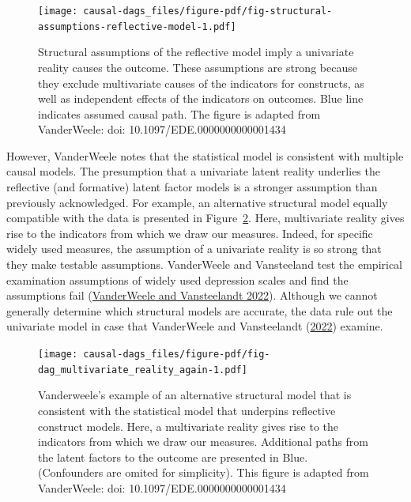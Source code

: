 \documentclass[
  singlecolumn]{article}
\begin{document}
\begin{figure}

{\centering \texttt{[image: causal-dags\_files/figure-pdf/fig-structural-assumptions-reflective-model-1.pdf]}

}

\caption{\label{fig-structural-assumptions-reflective-model}Structural
assumptions of the reflective model imply a univariate reality causes
the outcome. These assumptions are strong because they exclude
multivariate causes of the indicators for constructs, as well as
independent effects of the indicators on outcomes. Blue line indicates
assumed causal path. The figure is adapted from VanderWeele: doi:
10.1097/EDE.0000000000001434}

\end{figure}

However, VanderWeele notes that the statistical model is consistent with
multiple causal models. The presumption that a univariate latent reality
underlies the reflective (and formative) latent factor models is a
stronger assumption than previously acknowledged. For example, an
alternative structural model equally compatible with the data is
presented in Figure~\ref{fig-dag_multivariate_reality_again}. Here,
multivariate reality gives rise to the indicators from which we draw our
measures. Indeed, for specific widely used measures, the assumption of a
univariate reality is so strong that they make testable assumptions.
VanderWeele and Vansteeland test the empirical examination assumptions
of widely used depression scales and find the assumptions fail
(\protect\hyperlink{ref-vanderweele2022b}{VanderWeele and Vansteelandt
2022}). Although we cannot generally determine which structural models
are accurate, the data rule out the univariate model in case that
VanderWeele and Vansteelandt
(\protect\hyperlink{ref-vanderweele2022b}{2022}) examine.

\begin{figure}

{\centering \texttt{[image: causal-dags\_files/figure-pdf/fig-dag\_multivariate\_reality\_again-1.pdf]}

}

\caption{\label{fig-dag_multivariate_reality_again}Vanderweele's example
of an alternative structural model that is consistent with the
statistical model that underpins reflective construct models. Here, a
multivariate reality gives rise to the indicators from which we draw our
measures. Additional paths from the latent factors to the outcome are
presented in Blue. (Confounders are omited for simplicity). This figure
is adapted from VanderWeele: doi: 10.1097/EDE.0000000000001434}

\end{figure}
\end{document}

